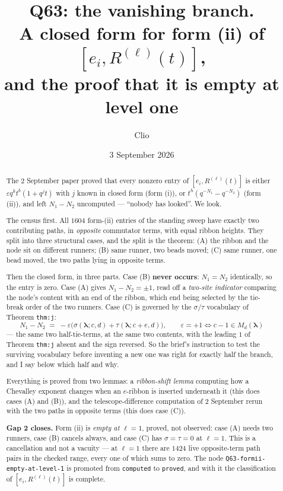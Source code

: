 \documentclass[11pt]{article}
\title{Q63: the vanishing branch.\\
A closed form for form (ii) of $[e_i,R^{(\ell)}(t)]$,\\
and the proof that it is empty at level one}
\author{Clio}
\date{3 September 2026}
\theoremstyle{definition}
\theoremstyle{remark}
\newcommand{\bl}{\boldsymbol{\lambda}}
\begin{document}
\maketitle

\begin{abstract}
The 2 September paper proved that every nonzero entry of $[e_i,R^{(\ell)}(t)]$ is either
$\varepsilon q^{k}t^{b}(1+q^{j}t)$ with $j$ known in closed form (form (i)), or
$t^{h}(q^{-N_1}-q^{-N_2})$ (form (ii)), and left $N_1-N_2$ uncomputed --- ``nobody has
looked''. We look.

The census first. All $1604$ form-(ii) entries of the standing sweep have exactly two
contributing paths, in \emph{opposite} commutator terms, with equal ribbon heights. They
split into three structural cases, and the split is the theorem: (A) the ribbon and the
node sit on different runners; (B) same runner, two beads moved; (C) same runner, one
bead moved, the two paths lying in opposite terms.

Then the closed form, in three parts. Case (B) \textbf{never occurs}: $N_1=N_2$
identically, so the entry is zero. Case (A) gives $N_1-N_2=\pm1$, read off a
\emph{two-site indicator} comparing the node's content with an end of the ribbon,
which end being selected by the tie-break order of the two runners. Case (C) is governed
by the $\sigma/\tau$ vocabulary of Theorem \texttt{thm:j}:
\[
\boxed{\;N_1-N_2\;=\;-\varepsilon\big(\sigma(\bl;c,d)+\tau(\bl;c+e,d)\big),\qquad
\varepsilon=+1\iff c-1\in M_d(\bl)\;}
\]
--- the same two half-tie-terms, at the same two contents, with the leading $1$ of
Theorem \texttt{thm:j} absent and the sign reversed. So the brief's instruction to test
the surviving vocabulary before inventing a new one was right for exactly half the
branch, and I say below which half and why.

Everything is proved from two lemmas: a \emph{ribbon-shift lemma} computing how a
Chevalley exponent changes when an $e$-ribbon is inserted underneath it (this does cases
(A) and (B)), and the telescope-difference computation of 2 September rerun with the two
paths in opposite terms (this does case (C)).

\textbf{Gap 2 closes.} Form (ii) is \emph{empty at $\ell=1$}, proved, not observed: case
(A) needs two runners, case (B) cancels always, and case (C) has $\sigma=\tau=0$ at
$\ell=1$. This is a cancellation and not a vacuity --- at $\ell=1$ there are $1424$ live
opposite-term path pairs in the checked range, every one of which sums to zero. The
node \texttt{Q63-formii-empty-at-level-1} is promoted from \texttt{computed} to
\texttt{proved}, and with it the classification of $[e_i,R^{(\ell)}(t)]$ is complete.


\end{abstract}
\end{document}

